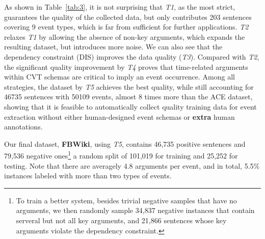 As shown in Table~\ref{tab:3}, it is not surprising that \emph{T1}, as the most strict, guarantees the quality of the collected data, but only contributes 203 sentences covering 9 event types, which is far from sufficient for further applications. \emph{T2} relaxes \emph{T1} by allowing the absence of non-key arguments, which expands the resulting dataset, but introduces more noise.
We can also see that the dependency constraint (DIS) improves the data quality (\emph{T3}).
Compared with \emph{T2}, the significant quality improvement by \emph{T4} proves that time-related arguments within CVT schemas are critical to imply an event occurrence. Among all strategies, the dataset by \emph{T5} achieves the best quality, while still accounting for 46735 sentences with 50109 events, almost 8 times more than the ACE dataset, showing that it is feasible to automatically collect quality training data for event extraction without either human-designed event schemas or \textbf{extra} human annotations.


Our final dataset, \textbf{FBWiki}, using \emph{T5}, contains 46,735 positive sentences and 79,536 negative ones\footnote{To train a better
system, besides trivial negative samples that have no arguments, we then randomly sample 34,837 negative instances that contain serveral
but not all key arguments, and 21,866 sentences whose key arguments violate the dependency constraint.}
 a random split of 101,019 for
training and 25,252 for testing. Note that there are averagely 4.8 arguments per event, and in total, 5.5\% instances labeled with more
than two types of events.

